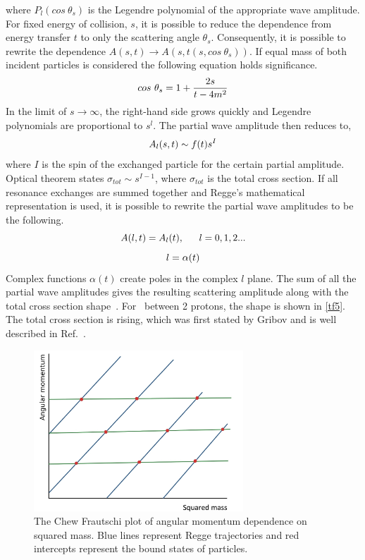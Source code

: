 where $P_l(cos~\theta_s)$ is the Legendre polynomial of the appropriate wave amplitude. For fixed energy of collision, $s$, it is possible to reduce the dependence from energy transfer $t$ to only the scattering angle $\theta_s$. Consequently, it is possible to rewrite the dependence $A(s,t) \rightarrow A(s,t(s, cos~\theta_s))$. If equal mass of both incident particles is considered the following equation holds significance.
\begin{equation}
    \centering
    cos~\theta_s = 1 + \frac{2s}{t - 4m^2}
    \label{t28}
\end{equation}
In the limit of $s \rightarrow \infty$, the right-hand side grows quickly and Legendre polynomials are proportional to $s^l$. The partial wave amplitude then reduces to,
\begin{equation}
    \centering
    A_l(s,t) \sim f(t) s^{I}
    \label{t29}
\end{equation}
where $I$ is the spin of the exchanged particle for the certain partial amplitude. Optical theorem states $\sigma_{tot} \sim s^{I - 1}$, where $\sigma_{tot}$ is the total cross section. If all resonance exchanges are summed together and Regge's mathematical representation is used, it is possible to rewrite the partial wave amplitudes to be the following.
\begin{equation}
    \centering
    A(l,t) = A_l(t), {\color{white} \longrightarrow} l = 0, 1, 2...
    \label{t30}
\end{equation}
\begin{equation}
    \centering
    l=\alpha(t)
    \label{t31}
\end{equation}
Complex functions $\alpha(t)$ create poles in the complex $l$ plane. The sum of all the partial wave amplitudes gives the resulting scattering amplitude along with the total cross section shape~\cite{PomeronPhysics}. For \DPE~between 2 protons, the shape is shown in \autoref{tf5}. The total cross section is rising, which was first stated by Gribov and is well described in Ref.~\cite{gribov2003}.
\FloatBarrier
\begin{figure}[ht]
    \centering
    \includegraphics[width=0.7\textwidth]{figures/CFplot.jpg}
    \caption[Chew-Frautschi plot]{The Chew Frautschi plot of angular momentum dependence on squared mass. Blue lines represent Regge trajectories and red intercepts represent the bound states of particles. }
    \label{tf4}
\end{figure}
\FloatBarrier
